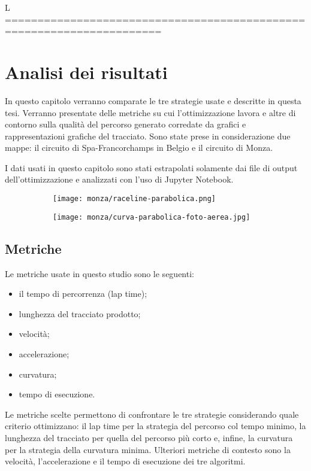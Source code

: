 L ======================================================================

\chapter{Analisi dei risultati}
In questo capitolo verranno comparate le tre strategie usate e descritte in questa tesi.
Verranno presentate delle metriche su cui l'ottimizzazione lavora e altre di contorno sulla
qualità del percorso generato corredate da grafici e rappresentazioni grafiche del tracciato.
Sono state prese in considerazione due mappe: il circuito di Spa-Francorchamps in Belgio e il circuito di
Monza.

I dati usati in questo capitolo sono stati estrapolati solamente dai file di output dell'ottimizzazione
e analizzati con l'uso di Jupyter Notebook.
\begin{figure}[H]
	\begin{center}
	\begin{subfigure}[l]{0.45\textwidth}
		\texttt{[image: monza/raceline-parabolica.png]}
	\end{subfigure}
	\begin{subfigure}[r]{0.5\textwidth}
		\texttt{[image: monza/curva-parabolica-foto-aerea.jpg]}
	\end{subfigure}
	\end{center}
\end{figure}
\newpage
\section{Metriche}
Le metriche usate in questo studio sono le seguenti:
\begin{itemize}
	\item il tempo di percorrenza (lap time);
	\item lunghezza del tracciato prodotto;
	\item velocità; %
	\item accelerazione; %
	\item curvatura; %
	\item tempo di esecuzione.
\end{itemize}
Le metriche scelte permettono di confrontare le tre strategie considerando quale criterio 
ottimizzano: il lap time per la strategia del percorso col tempo minimo, la lunghezza del tracciato per
quella del percorso più corto e, infine, la curvatura per la strategia della curvatura minima.
Ulteriori metriche di contesto sono la velocità, l'accelerazione e il tempo di esecuzione dei tre
algoritmi.

